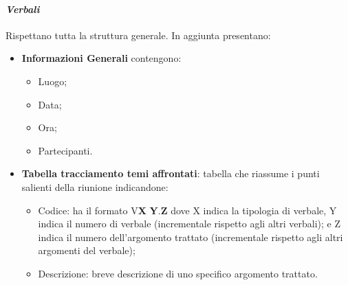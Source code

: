 \paragraph{\textit{Verbali}}
Rispettano tutta la struttura generale.
In aggiunta presentano:
\begin{itemize} 
    \item \textbf{Informazioni Generali}
    contengono:
    \begin{itemize} 
        \item Luogo;
        \item Data;
        \item Ora;
        \item Partecipanti.
    \end{itemize}
\item \textbf{Tabella tracciamento temi affrontati}:
tabella che riassume i punti salienti della riunione indicandone:
    \begin{itemize} 
        \item Codice: ha il formato V\textbf{X} \textbf{Y}.\textbf{Z} dove X indica la tipologia di verbale, Y indica il numero di verbale (incrementale rispetto agli altri verbali);
        e Z indica il numero dell'argomento trattato (incrementale rispetto agli altri argomenti del verbale);
        \item Descrizione: breve descrizione di uno specifico argomento trattato.
    \end{itemize}

\end{itemize}